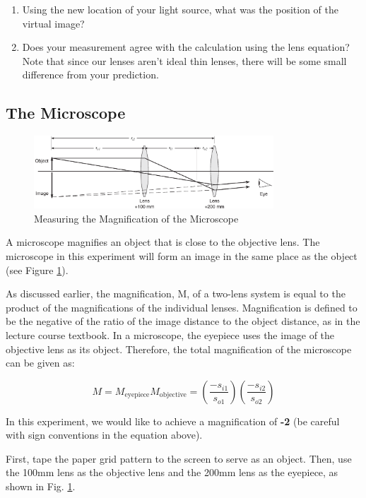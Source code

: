 \begin{enumerate}
\item Using the new location of your light source, what was the position of the virtual image?

\item Does your measurement agree with the calculation using the lens equation? Note that since our lenses aren't ideal thin lenses, there will be some small  difference from your prediction.

\end{enumerate}

\subsection{The Microscope}
\myskip
\begin{figure}[h]
\centering
\includegraphics[width=0.8\textwidth]{./Exp7/pic/image9a.png}
\caption{Measuring the Magnification of the Microscope}
\label{fig:microscope}
\end{figure}

A microscope magnifies an object that is close to the objective lens. The microscope in this experiment will form an image in the same place as the object (see Figure \ref{fig:microscope}).\myskip

As discussed earlier, the magnification, M, of a two-lens system is equal to the product of the magnifications
of the individual lenses. Magnification is defined to be the negative of the ratio of the image distance to the object distance, as in the lecture course textbook. In a microscope, the eyepiece uses the image of the objective lens as its object. Therefore, the total magnification of the microscope can be given as:

\begin{equation}
\label{eq:magnification}
	M=M_{\text{eyepiece}}M_{\text{objective}} =  \left(\frac{-s_{i1}}{s_{o1}}\right) \left(\frac{-s_{i2}}{s_{o2}}\right)
\end{equation}

In this experiment, we would like to achieve a magnification of \textbf{-2} (be careful with sign conventions in the equation above).\myskip

First, tape the paper grid pattern to the screen to serve as an object. Then, use the 100mm lens as the objective lens and the 200mm lens as the eyepiece, as shown in Fig. \ref{fig:microscope}.

